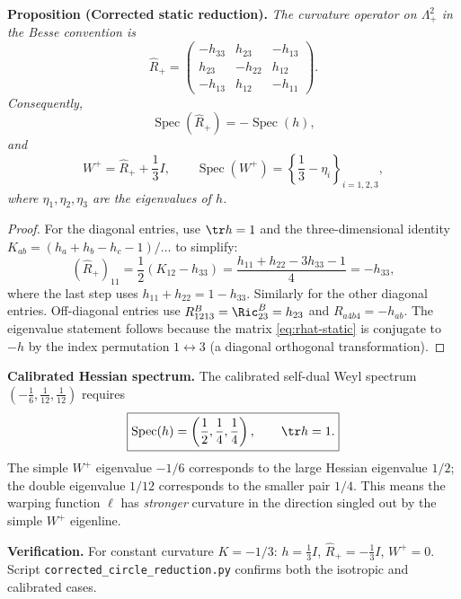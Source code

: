 \medskip
\noindent\textbf{Proposition (Corrected static reduction).}
\emph{The curvature operator on $\Lambda^2_+$ in the Besse convention is}
\begin{equation}\label{eq:rhat-static}
 \widehat R_+=
 \begin{pmatrix}
  -h_{33}&h_{23}&-h_{13}\\
  h_{23}&-h_{22}&h_{12}\\
  -h_{13}&h_{12}&-h_{11}
 \end{pmatrix}.
\end{equation}
\emph{Consequently,}
\begin{equation}\label{eq:spec-rhat}
 \boxed{\operatorname{Spec}(\widehat R_+)=-\operatorname{Spec}(h),}
\end{equation}
\emph{and}
\begin{equation}\label{eq:wplus-static}
 W^+=\widehat R_++\frac13I,
 \qquad
 \boxed{\operatorname{Spec}(W^+)
  =\left\{\frac13-\eta_i\right\}_{i=1,2,3},}
\end{equation}
\emph{where $\eta_1,\eta_2,\eta_3$ are the eigenvalues of $h$.}

\begin{proof}
For the diagonal entries, use $\tr h=1$ and the three-dimensional identity
$K_{ab}=(h_a+h_b-h_c-1)/\ldots$ to simplify:
\[
 (\widehat R_+)_{11}=\frac12(K_{12}-h_{33})
 =\frac{h_{11}+h_{22}-3h_{33}-1}{4}=-h_{33},
\]
where the last step uses $h_{11}+h_{22}=1-h_{33}$.  Similarly for the other
diagonal entries.  Off-diagonal entries use $R^B_{1213}=\Ric^B_{23}=h_{23}$
and $R_{a4b4}=-h_{ab}$.  The eigenvalue statement follows because the matrix
\eqref{eq:rhat-static} is conjugate to $-h$ by the index permutation
$1\leftrightarrow3$ (a diagonal orthogonal transformation).
\end{proof}

\noindent\textbf{Calibrated Hessian spectrum.}
The calibrated self-dual Weyl spectrum
$(-\frac16,\frac1{12},\frac1{12})$ requires
\begin{equation}\label{eq:h-calibrated}
 \boxed{\operatorname{Spec}(h)=\left(\frac12,\frac14,\frac14\right),
 \qquad \tr h=1.}
\end{equation}
The simple $W^+$ eigenvalue $-1/6$ corresponds to the large Hessian
eigenvalue $1/2$; the double eigenvalue $1/12$ corresponds to the
smaller pair $1/4$.  This means the warping function $\ell$ has
\emph{stronger} curvature in the direction singled out by the simple
$W^+$ eigenline.

\medskip
\noindent\textbf{Verification.}
For constant curvature $K=-1/3$: $h=\frac13I$, $\widehat R_+=-\frac13I$,
$W^+=0$.  Script \texttt{corrected\_circle\_reduction.py} confirms both
the isotropic and calibrated cases.

